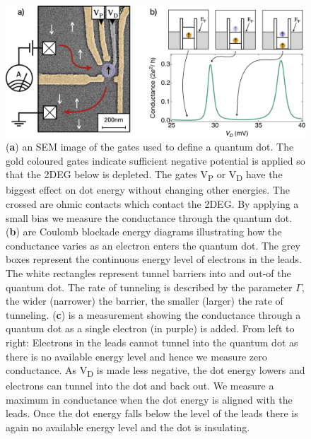 \begin{figure}[ht]
  \begin{center}
    \includegraphics[width=1.0\textwidth]{figures/ch1/crop_PosterFiguresMaster.003.png}
    \caption[Conductance through a quantum dot]{\label{fig:ch1/dot_intro} 
    (\textbf{a}) an SEM image of the gates used to define a quantum dot. The gold coloured gates indicate sufficient negative potential is applied so that the 2DEG below is depleted. The gates V\textsubscript{P} or V\textsubscript{D} have the biggest effect on dot energy without changing other energies. The crossed are ohmic contacts which contact the 2DEG. By applying a small bias we measure the conductance through the quantum dot. (\textbf{b}) are Coulomb blockade energy diagrams illustrating how the conductance varies as an electron enters the quantum dot. The grey boxes represent the continuous energy level of electrons in the leads. The white rectangles represent tunnel barriers into and out-of the quantum dot. The rate of tunneling is described by the parameter $\Gamma$, the wider (narrower) the barrier, the smaller (larger) the rate of tunneling. (\textbf{c}) is a measurement showing the conductance through a quantum dot as a single electron (in purple) is added. From left to right: Electrons in the leads cannot tunnel into the quantum dot as there is no available energy level and hence we measure zero conductance. As V\textsubscript{D} is made less negative, the dot energy lowers and electrons can tunnel into the dot and back out. We measure a maximum in conductance when the dot energy is aligned with the leads. Once the dot energy falls below the level of the leads there is again no available energy level and the dot is insulating. 
      }
  \end{center}
\end{figure}



